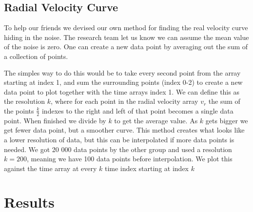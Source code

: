 \documentclass[reprint,english,notitlepage]{revtex4-2}
\begin{document}
\subsection{Radial Velocity Curve}
	To help our friends we devised our own method for finding the real velocity curve hiding in the noise. The research team let us know we can assume the mean value of the noise is zero. One can create a new data point by averaging out the sum of a collection of points.
	 
	The simples way to do this would be to take every second point from the array starting at index 1, and sum the surrounding points (index 0-2) to create a new data point to plot together with the time arrays index 1. We can define this as the resolution $ k $, where for each point in the radial velocity array $ v_r $ the sum of the points $ \frac{k}{2} $ indexes to the right and left of that point becomes a single data point. When finished we divide by $ k $ to get the average value. As $ k $ gets bigger we get fewer data point, but a smoother curve. This method creates what looks like a lower resolution of data, but this can be interpolated if more data points is needed. We got 20 000 data points by the other group and used a resolution $ k = 200 $, meaning we have 100 data points before interpolation. We plot this against the time array at every $ k $ time index starting at index $ k $


\section{Results}
\end{document}
